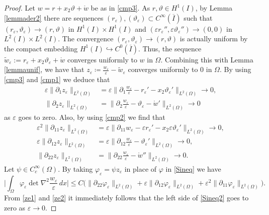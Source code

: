 \documentclass[10pt,a4paper]{amsart}
\newcommand\e{\varepsilon}
\newcommand\embed{\hookrightarrow} %
\begin{document}
	\begin{proof}
		Let $w=r+x_2\vartheta+\mathring{w}$ be as in \eqref{cmp3}.
		As $r,\vartheta \in H^1(I)$, by Lemma \ref{lemmader2} there are  sequences $(r_\e), (\vartheta_\e) \subset C^\infty(\overline{I})$ such that $(r_\e, \vartheta_\e) \to (r, \vartheta)$ in $H^1(I)\times H^1(I)$  and $(\e r_\e'',\e \vartheta_\e'')\to (0,0)$ in $L^2(I)\times L^2(I)$.  The convergence $(r_\e, \vartheta_\e) \to (r, \vartheta)$ is actually uniform by the compact embedding $H^1(I) \embed C^0(\overline{I})$. Thus, the sequence $\tilde w_\e:=r_\e + x_2 \vartheta_\e+\mathring{w}$ converges uniformly to $w$ in $\Omega$.
		Combining this with Lemma \ref{lemmaunif}, we have that
		$z_\e\coloneqq   \frac{w_\e}{\e} - \tilde w_\e$ converges uniformly to $0$ in $\Omega$.
		By using \eqref{cmp3} and \eqref{cmp1} we deduce that
		\begin{equation}\label{ze1}
			\begin{aligned}
				\e\|\partial_1 z_\e\|_{L^2(\Omega)}&=\e\|\partial_1 \frac{w_\e}\e-r_\e'-x_2\vartheta_\e'\|_{L^2(\Omega)}\to 0,\\
				\|\partial_2 z_\e\|_{L^2(\Omega)}&=\|\partial_2 \frac{w_\e}\e-\vartheta_\e-\mathring{w}'\|_{L^2(\Omega)}\to 0
			\end{aligned}
		\end{equation}
		as $\e$ goes to zero. Also, by using \eqref{cmp2} we find that
		\begin{equation}\label{ze2}
			\begin{aligned}
				\e^2\|\partial_{11} z_\e\|_{L^2(\Omega)}&=\e\|\partial_{11} w_\e-\e r_\e'-x_2\e\vartheta_\e'\|_{L^2(\Omega)}\to 0,\\
				\e\|\partial_{12} z_\e\|_{L^2(\Omega)}&=\e\|\partial_{12} \frac{w_\e}\e-\vartheta_\e'\|_{L^2(\Omega)}\to 0,\\
				\|\partial_{22} z_\e\|_{L^2(\Omega)}&=\|\partial_{22} \frac{w_\e}\e-\mathring{w}''\|_{L^2(\Omega)}\to 0.
			\end{aligned}
		\end{equation}
		Let $\psi \in C_c^\infty(\Omega)$. By taking
		$\varphi_\e = \psi z_\e$ in place of $\varphi$ in \eqref{Sineq} we have
		\begin{equation}\label{Sineq2}
			\Big|\int_\Omega\varphi_\e \det \nabla^2\frac{w_\e}{\e} \,dx\Big|\le C\big(\|\partial_{22}\varphi _\e\|_{L^2(\Omega)}+\e\|\partial_{12}\varphi_\e\|_{L^2(\Omega)}+\e^2\|\partial_{11}\varphi_\e\|_{L^2(\Omega)}\big).
		\end{equation}
		From \eqref{ze1} and \eqref{ze2} it immediately follows that the left side of \eqref{Sineq2} goes to zero as $\e\to 0$.


\end{proof}
\end{document}

